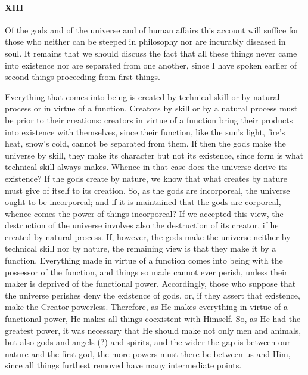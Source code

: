 \documentclass[12pt]{article}
\begin{document}
\paragraph{XIII} Of the gods and of the universe and of human affairs this
account will suffice for those who neither can be steeped in philosophy nor are
incurably diseased in soul. It remains that we should discuss the fact that all
these things never came into existence nor are separated from one another,
since I have spoken earlier of second things proceeding from first things.

Everything that comes into being is created by technical skill or by natural
process or in virtue of a function. Creators by skill or by a natural process
must be prior to their creations: creators in virtue of a function bring their
products into existence with themselves, since their function, like the sun's
light, fire's heat, snow's cold, cannot be separated from them. If then the
gods make the universe by skill, they make its character but not its existence,
since form is what technical skill always makes. Whence in that case does the
universe derive its existence? If the gods create by nature, we know that what
creates by nature must give of itself to its creation. So, as the gods are
incorporeal, the universe ought to be incorporeal; and if it is maintained that
the gods are corporeal, whence comes the power of things incorporeal? If we
accepted this view, the destruction of the universe involves also the
destruction of its creator, if he created by natural process. If, however, the
gods make the universe neither by technical skill nor by nature, the remaining
view is that they make it by a function. Everything made in virtue of a
function comes into being with the possessor of the function, and things so
made cannot ever perish, unless their maker is deprived of the functional
power. Accordingly, those who suppose that the universe perishes deny the
existence of gods, or, if they assert that existence, make the Creator
powerless. Therefore, as He makes everything in virtue of a functional power,
He makes all things coexistent with Himself. So, as He had the greatest power,
it was necessary that He should make not only men and animals, but also gods
and angels (?) and spirits, and the wider the gap is between our nature and the
first god, the more powers must there be between us and Him, since all things
furthest removed have many intermediate points.
\end{document}

